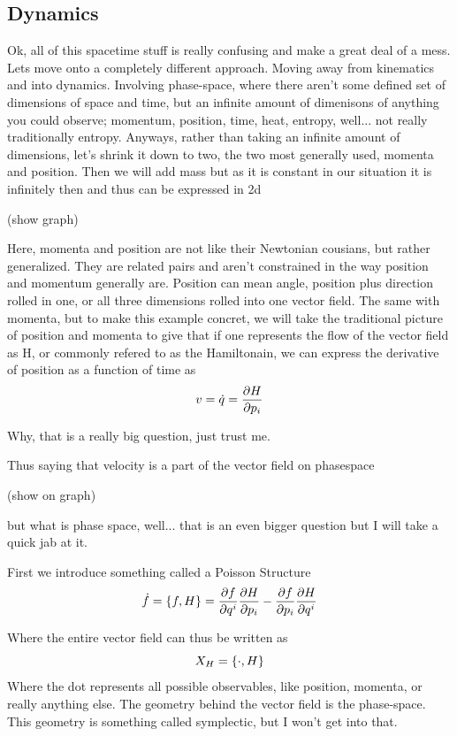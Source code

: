 \subsection{Dynamics}

Ok, all of this spacetime stuff is really confusing and make a great deal of a mess. Lets move onto a completely different approach. Moving away from kinematics and into dynamics. Involving phase-space, where there aren't some defined set of dimensions of space and time, but an infinite amount of dimenisons of anything you could observe; momentum, position, time, heat, entropy, well... not really traditionally entropy. Anyways, rather than taking an infinite amount of dimensions, let's shrink it down to two, the two most generally used, momenta and position. Then we will add mass but as it is constant in our situation it is infinitely then and thus can be expressed in 2d

(show graph)

Here, momenta and position are not like their Newtonian cousians, but rather generalized. They are related pairs and aren't constrained in the way position and momentum generally are. Position can mean angle, position plus direction rolled in one, or all three dimensions rolled into one vector field. The same with momenta, but to make this example concret, we will take the traditional picture of position and momenta to give that if one represents the flow of the vector field as H, or commonly refered to as the Hamiltonain, we can express the derivative of position as a function of time as
\[
	v = \dot{q} = \pdv{H}{p_i}
\]

Why, that is a really big question, just trust me.

Thus saying that velocity is a part of the vector field on phasespace

(show on graph)

but what is phase space, well... that is an even bigger question but I will take a quick jab at it.

First we introduce something called a Poisson Structure
\[
	\dot{f} = \pb{f}{H} = \pdv{f}{q^i} \pdv{H}{p_i} - \pdv{f}{p_i} \pdv{H}{q^i}
\]

Where the entire vector field can thus be written as
\[
	X_H = \pb{\cdot}{H}
\]
Where the dot represents all possible observables, like position, momenta, or really anything else. The geometry behind the vector field is the phase-space. This geometry is something called symplectic, but I won't get into that.


